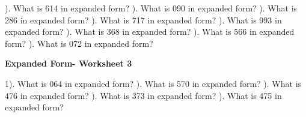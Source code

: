 \documentclass{article}%
\begin{document}
). What is 614 in expanded form?%
\newline%
\newline%
). What is 090 in expanded form?%
\newline%
\newline%
). What is 286 in expanded form?%
\newline%
\newline%
). What is 717 in expanded form?%
\newline%
\newline%
). What is 993 in expanded form?%
\newline%
\newline%
). What is 368 in expanded form?%
\newline%
\newline%
). What is 566 in expanded form?%
\newline%
\newline%
). What is 072 in expanded form?%
\newline%
\newline%
\newline%
\pagebreak%
\large%
\begin{center}%
\textbf{Expanded Form- Worksheet 3}%
\newline%
\end{center} \normalsize%
1). What is 064 in expanded form?%
\newline%
\newline%
). What is 570 in expanded form?%
\newline%
\newline%
). What is 476 in expanded form?%
\newline%
\newline%
). What is 373 in expanded form?%
\newline%
\newline%
). What is 475 in expanded form?%
\newline%
\newline%
\end{document}

